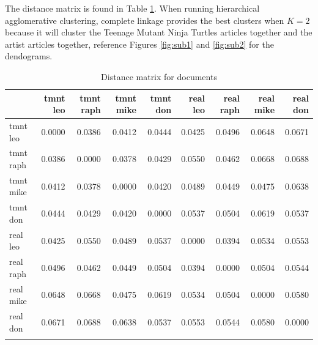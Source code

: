 \documentclass[12pt]{article}
\begin{document}
The distance matrix is found in Table \ref{distance_matrix}. When running hierarchical agglomerative clustering, complete linkage provides the best clusters when $K=2$ because it will cluster the Teenage Mutant Ninja Turtles articles together and the artist articles together, reference Figures \ref{fig:sub1} and \ref{fig:sub2} for the dendograms. 

\begin{table}[h!]
    \centering
    \caption{Distance matrix for documents}
    \vspace*{4mm}
    \label{distance_matrix}
    \begin{tabular}{lrrrrrrrr}
        \Xhline{3\arrayrulewidth}
        & tmnt leo & tmnt raph & tmnt mike & tmnt don & real leo & real raph & real mike & real don \\\hline
        tmnt leo & 0.0000 & 0.0386 & 0.0412 & 0.0444 & 0.0425 & 0.0496 & 0.0648 & 0.0671 \\
        tmnt raph & 0.0386 & 0.0000 & 0.0378 & 0.0429 & 0.0550 & 0.0462 & 0.0668 & 0.0688 \\
        tmnt mike & 0.0412 & 0.0378 & 0.0000 & 0.0420 & 0.0489 & 0.0449 & 0.0475 & 0.0638 \\
        tmnt don & 0.0444 & 0.0429 & 0.0420 & 0.0000 & 0.0537 & 0.0504 & 0.0619 & 0.0537 \\
        real leo & 0.0425 & 0.0550 & 0.0489 & 0.0537 & 0.0000 & 0.0394 & 0.0534 & 0.0553 \\
        real raph & 0.0496 & 0.0462 & 0.0449 & 0.0504 & 0.0394 & 0.0000 & 0.0504 & 0.0544 \\
        real mike & 0.0648 & 0.0668 & 0.0475 & 0.0619 & 0.0534 & 0.0504 & 0.0000 & 0.0580 \\
        real don & 0.0671 & 0.0688 & 0.0638 & 0.0537 & 0.0553 & 0.0544 & 0.0580 & 0.0000 \\
    \Xhline{3\arrayrulewidth}
    \end{tabular}
\end{table}
\end{document}
